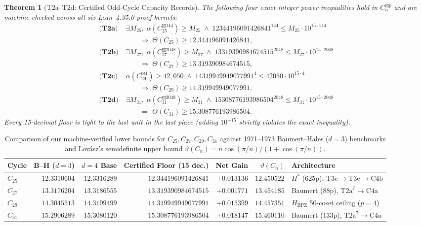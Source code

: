 \documentclass[11pt,reqno]{amsart}
\newtheorem{theorem}{Theorem}[section]
\theoremstyle{definition}
\newcommand{\sprod}{\boxtimes}
\newcommand{\Hbpz}{H_{\mathrm{BPZ}}}
\newcommand{\Hstar}{H^*}
\begin{document}
\begin{theorem}[T2a--T2d: Certified Odd-Cycle Capacity Records]\label{thm:t2}
The following four exact integer power inequalities hold in $C_n^{\sprod p}$ and are machine-checked across all six Lean~4.35.0 proof kernels:
\begin{align*}
  \textbf{(T2a)}\;& \exists M_{25},\;\alpha(C_{25}^{\sprod 144}) \ge M_{25}
    \;\land\; 12344196091426841^{144} \le M_{25}\cdot 10^{15\cdot 144} \\
    &\qquad\Longrightarrow\; \Theta(C_{25}) \ge 12.344196091426841, \\[3pt]
  \textbf{(T2b)}\;& \exists M_{27},\;\alpha(C_{27}^{\sprod 2048}) \ge M_{27}
    \;\land\; 13319390984674515^{2048} \le M_{27}\cdot 10^{15\cdot 2048} \\
    &\qquad\Longrightarrow\; \Theta(C_{27}) \ge 13.319390984674515, \\[3pt]
  \textbf{(T2c)}\;& \alpha(C_{29}^{\sprod 4}) \ge 42{,}050
    \;\land\; 14319949949077991^{4} \le 42050\cdot 10^{15\cdot 4} \\
    &\qquad\Longrightarrow\; \Theta(C_{29}) \ge 14.319949949077991, \\[3pt]
  \textbf{(T2d)}\;& \exists M_{31},\;\alpha(C_{31}^{\sprod 2048}) \ge M_{31}
    \;\land\; 15308776193986504^{2048} \le M_{31}\cdot 10^{15\cdot 2048} \\
    &\qquad\Longrightarrow\; \Theta(C_{31}) \ge 15.308776193986504.
\end{align*}
Every 15-decimal floor is tight to the last unit in the last place (adding $10^{-15}$ strictly violates the exact inequality).
\end{theorem}

\begin{table}[t]
\centering
\caption{Comparison of our machine-verified lower bounds for $C_{25}, C_{27}, C_{29}, C_{31}$ against 1971--1973 Baumert--Hales ($d=3$) benchmarks and Lovász's semidefinite upper bound $\vartheta(C_n) = n\cos(\pi/n)/(1+\cos(\pi/n))$.}\label{tab:records}
\footnotesize
\setlength{\tabcolsep}{3.5pt}
\begin{tabular}{@{}lrrrrrl@{}}
\toprule
Cycle & B--H ($d=3$) & $d=4$ Base & Certified Floor (15 dec.) & Net Gain & $\vartheta(C_n)$ & Architecture \\
\midrule
$C_{25}$ & $12.3310604$ & $12.3316289$ & $\mathbf{12.344196091426841}$ & $+0.013136$ & $12.450522$ & $\Hstar$ (625p), $\mathrm{T3c}\!\to\!\mathrm{T3e}\!\to\!\mathrm{C4b}$ \\
$C_{27}$ & $13.3176204$ & $13.3186555$ & $\mathbf{13.319390984674515}$ & $+0.001771$ & $13.454185$ & Baumert (88p), $\mathrm{T2a}^7\!\to\!\mathrm{C4a}$ \\
$C_{29}$ & $14.3045513$ & $14.3199499$ & $\mathbf{14.319949949077991}$ & $+0.015399$ & $14.457351$ & $\Hbpz$ 50-coset ceiling ($p=4$) \\
$C_{31}$ & $15.2906289$ & $15.3080120$ & $\mathbf{15.308776193986504}$ & $+0.018147$ & $15.460110$ & Baumert (133p), $\mathrm{T2a}^7\!\to\!\mathrm{C4a}$ \\
\bottomrule
\end{tabular}
\end{table}
\end{document}
